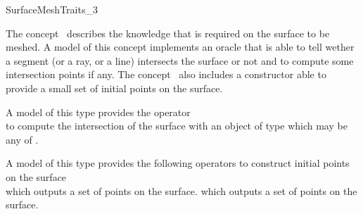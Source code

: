 

\begin{ccRefConcept}{SurfaceMeshTraits_3}


\ccDefinition
  
The concept \ccRefName\ describes the knowledge that is required on the
surface to be meshed. A model of this concept
implements an oracle that is able to tell wether a segment
(or a ray,  or a line) intersects the surface or not
and to compute some intersection
points if any. The concept \ccRefName\ also includes a constructor able  to provide
a small set of initial points on the surface.


\ccTypes

\ccGlue
{}
\ccGlue
{}
\ccGlue
{}


{A model of this type provides the operator \\
to compute the intersection of the surface  
with an object of type  which may be  any of 
 .}


{A model of this type provides the following operators
to construct initial points on the surface \\
which {outputs a set of points on the surface.}
\ccGlue
{}
which {outputs a set of  points on the surface.}


}
\end{ccRefConcept}
